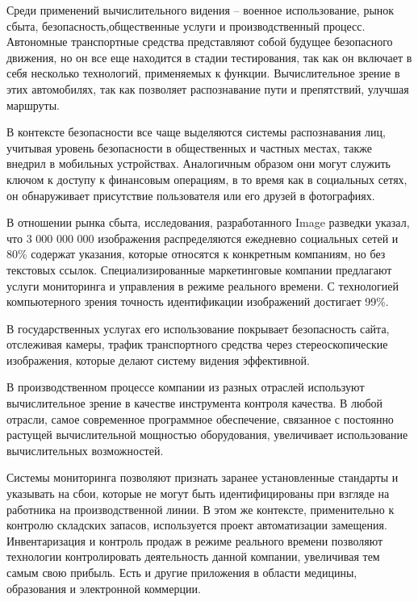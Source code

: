  Среди применений вычислительного видения – военное использование, рынок сбыта, безопасность,общественные услуги и производственный процесс. 
 Автономные транспортные средства представляют собой будущее безопасного движения, но он все еще находится в стадии тестирования, 
 так как он включает в себя несколько технологий, применяемых к функции. Вычислительное зрение в этих автомобилях,
 так как позволяет распознавание пути и препятствий, улучшая маршруты.

 В контексте безопасности все чаще выделяются системы распознавания лиц,
 учитывая уровень безопасности в общественных и частных местах, 
 также внедрил в мобильных устройствах.
 Аналогичным образом они могут служить ключом к доступу к финансовым операциям,
 в то время как в социальных сетях, он обнаруживает присутствие пользователя или его друзей в фотографиях. 

 В отношении рынка сбыта, исследования, разработанного Image разведки указал,
 что 3 000 000 000 изображения распределяются ежедневно социальных сетей и 80\% 
 содержат указания, которые относятся к конкретным компаниям, но без текстовых ссылок.
 Специализированные маркетинговые компании предлагают услуги мониторинга и управления в режиме реального времени. 
 С технологией компьютерного зрения точность идентификации изображений достигает 99\%.

 В государственных услугах его использование покрывает безопасность сайта, отслеживая камеры, 
 трафик транспортного средства через стереоскопические изображения, 
 которые делают систему видения эффективной.

 В производственном процессе компании из разных отраслей используют 
 вычислительное зрение в качестве инструмента контроля качества.
 В любой отрасли, самое современное программное обеспечение,
 связанное с постоянно растущей вычислительной мощностью оборудования,
 увеличивает использование вычислительных возможностей. 

 Системы мониторинга позволяют признать заранее установленные стандарты и указывать на сбои, которые не могут быть идентифицированы при взгляде на работника на производственной линии.
 В этом же контексте, применительно к контролю складских запасов, используется проект автоматизации замещения.
 Инвентаризация и контроль продаж в режиме реального времени позволяют технологии контролировать деятельность данной компании, 
 увеличивая тем самым свою прибыль. Есть и другие приложения в области медицины, образования и электронной коммерции.